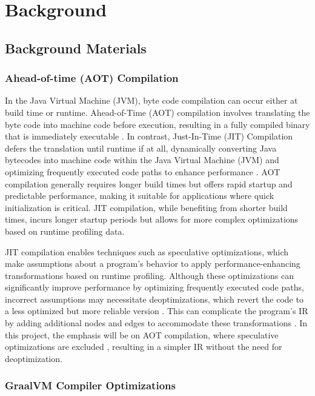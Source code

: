 \chapter[Background and Related Works]{Background}

\section{Background Materials}
\subsection{Ahead-of-time (AOT) Compilation}
In the Java Virtual Machine (JVM), byte code compilation can occur either at build time or runtime. Ahead-of-Time (AOT) compilation involves translating the byte code into machine code before execution, resulting in a fully compiled binary that is immediately executable \cite{Wade2017}. In contrast, Just-In-Time (JIT) Compilation defers the translation until runtime if at all, dynamically converting Java bytecodes into machine code within the Java Virtual Machine (JVM) and optimizing frequently executed code paths to enhance performance \cite{Wade2017}. AOT compilation generally requires longer build times but offers rapid startup and predictable performance, making it suitable for applications where quick initialization is critical. JIT compilation, while benefiting from shorter build times, incurs longer startup periods but allows for more complex optimizations based on runtime profiling data.

JIT compilation enables techniques such as speculative optimizations, which make assumptions about a program’s behavior to apply performance-enhancing transformations based on runtime profiling. Although these optimizations can significantly improve performance by optimizing frequently executed code paths, incorrect assumptions may necessitate deoptimizations, which revert the code to a less optimized but more reliable version \cite{Duboscq2013Inproceedings}. This can complicate the program's IR by adding additional nodes and edges to accommodate these transformations \cite{Duboscq2013Inproceedings}. In this project, the emphasis will be on AOT compilation, where speculative optimizations are excluded \cite{Wimmer2019}, resulting in a simpler IR without the need for deoptimization.

\subsection{GraalVM Compiler Optimizations}

